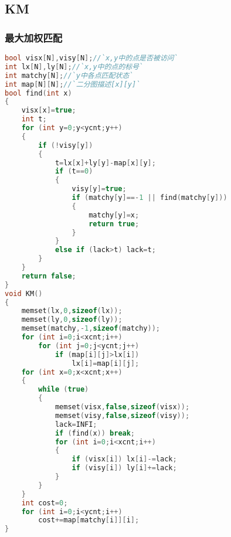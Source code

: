 \subsection{KM}
	\subsubsection{最大加权匹配}
	\begin{lstlisting}[language=c++]
bool visx[N],visy[N];//`x,y中的点是否被访问`
int lx[N],ly[N];//`x,y中的点的标号`
int matchy[N];//`y中各点匹配状态`
int map[N][N];//`二分图描述[x][y]`
bool find(int x)
{
	visx[x]=true;
	int t;
	for (int y=0;y<ycnt;y++)
	{
		if (!visy[y])
		{
			t=lx[x]+ly[y]-map[x][y];
			if (t==0)
			{
				visy[y]=true;
				if (matchy[y]==-1 || find(matchy[y]))
				{
					matchy[y]=x;
					return true;
				}
			}
			else if (lack>t) lack=t;
		}
	}
	return false;
}
void KM()
{
	memset(lx,0,sizeof(lx));
	memset(ly,0,sizeof(ly));
	memset(matchy,-1,sizeof(matchy));
	for (int i=0;i<xcnt;i++)
		for (int j=0;j<ycnt;j++)
			if (map[i][j]>lx[i])
				lx[i]=map[i][j];
	for (int x=0;x<xcnt;x++)
	{
		while (true)
		{
			memset(visx,false,sizeof(visx));
			memset(visy,false,sizeof(visy));
			lack=INFI;
			if (find(x)) break;
			for (int i=0;i<xcnt;i++)
			{
				if (visx[i]) lx[i]-=lack;
				if (visy[i]) ly[i]+=lack;
			}
		}
	}
	int cost=0;
	for (int i=0;i<ycnt;i++)
		cost+=map[matchy[i]][i];
}
	\end{lstlisting}

